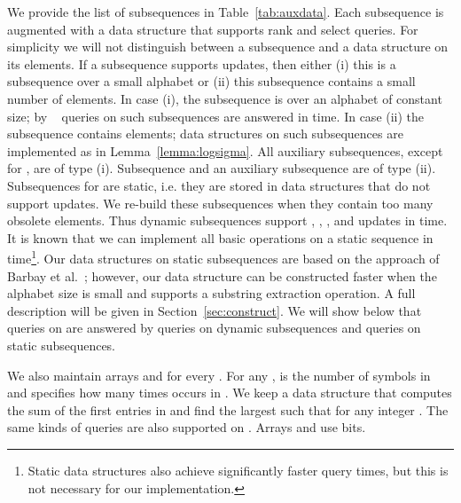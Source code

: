 \documentclass[11pt]{article}\usepackage{fullpage}
\newcommand{\shlongver}[2]{#2}
\begin{document}
We provide the list of subsequences in Table~\ref{tab:auxdata}. Each subsequence is augmented with a data structure that supports rank and select queries.  
For simplicity we will not distinguish between a subsequence and a data structure on its elements. 
If a subsequence supports updates, then either (i) this is a subsequence over 
a small alphabet or (ii) this subsequence contains a small number of elements. 
In case (i), the subsequence is over an alphabet of constant size; by ~\cite{NS14,HM10} queries on such subsequences are answered in  time. In case (ii) the subsequence contains  elements; data structures on such subsequences are implemented as in Lemma~\ref{lemma:logsigma}. 
All auxiliary subsequences, except for , are of type (i). Subsequence  and an auxiliary subsequence  are of type (ii). Subsequences  for  are static, i.e. they are stored in data structures that do not support updates. We re-build these subsequences when they contain too many obsolete elements.  Thus dynamic subsequences support , , , and updates in  time. It is known that we can implement all basic operations on a static sequence in  time\footnote{Static data structures also achieve significantly faster query times, but this is not necessary for our implementation.}. Our data structures on static subsequences are based on the approach of Barbay et al.~\cite{BHMR07}; however, our data structure can be constructed faster when the alphabet size is small and supports a substring extraction operation. A full description will be given in \shlongver{the full version of this paper}{Section~\ref{sec:construct}}. We will show below that queries on  are answered by  queries on dynamic subsequences and  queries on static subsequences.

We also maintain arrays  and  for every . For any ,  is the number of symbols in  and  specifies how many times  occurs in . We keep a data structure that computes  the sum of the first  entries in  and find the largest  such that  for any integer . The same kinds of queries are also supported on .  Arrays  and 
 use  bits. 
\end{document}
